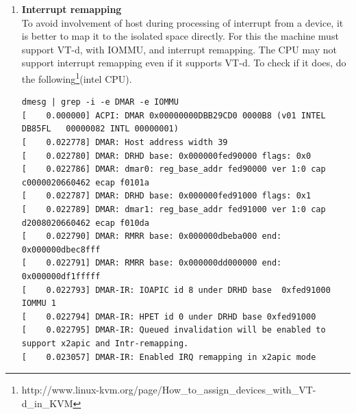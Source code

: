 \documentclass[twoside]{iitbreport}
\begin{document}
\begin{enumerate}
\item \textbf{Interrupt remapping}\\
To avoid involvement of host during processing of interrupt from a device, it is better to map it to the isolated space directly. For this the machine must support VT-d, with IOMMU, and interrupt remapping. The CPU may not support interrupt remapping even if it supports VT-d. To check if it does, do the following\footnote{http://www.linux-kvm.org/page/How\_to\_assign\_devices\_with\_VT-d\_in\_KVM}(intel CPU).

\begin{lstlisting}
dmesg | grep -i -e DMAR -e IOMMU
[    0.000000] ACPI: DMAR 0x00000000DBB29CD0 0000B8 (v01 INTEL  DB85FL   00000082 INTL 00000001)
[    0.022778] DMAR: Host address width 39
[    0.022780] DMAR: DRHD base: 0x000000fed90000 flags: 0x0
[    0.022786] DMAR: dmar0: reg_base_addr fed90000 ver 1:0 cap c0000020660462 ecap f0101a
[    0.022787] DMAR: DRHD base: 0x000000fed91000 flags: 0x1
[    0.022789] DMAR: dmar1: reg_base_addr fed91000 ver 1:0 cap d2008020660462 ecap f010da
[    0.022790] DMAR: RMRR base: 0x000000dbeba000 end: 0x000000dbec8fff
[    0.022791] DMAR: RMRR base: 0x000000dd000000 end: 0x000000df1fffff
[    0.022793] DMAR-IR: IOAPIC id 8 under DRHD base  0xfed91000 IOMMU 1
[    0.022794] DMAR-IR: HPET id 0 under DRHD base 0xfed91000
[    0.022795] DMAR-IR: Queued invalidation will be enabled to support x2apic and Intr-remapping.
[    0.023057] DMAR-IR: Enabled IRQ remapping in x2apic mode

\end{lstlisting}


\end{enumerate}
\end{document}
